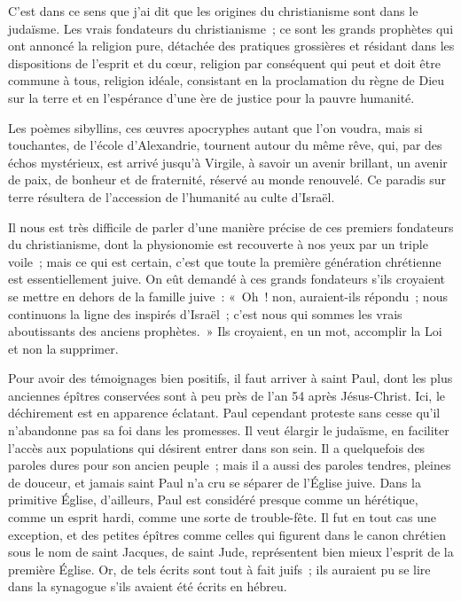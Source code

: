 \documentclass[french,twoside]{book} %
\newcommand\orgName[1]{#1}
\newcommand\persName[1]{#1}
\begin{document}
C’est dans ce sens que j’ai dit que les origines du christianisme sont dans le judaïsme. Les vrais fondateurs du christianisme ; ce sont les grands prophètes qui ont annoncé la religion pure, détachée des pratiques grossières et résidant dans les dispositions de l’esprit et du cœur, religion par conséquent qui peut et doit être commune à tous, religion idéale, consistant en la proclamation du règne de Dieu sur la terre et en l’espérance d’une ère de justice pour la pauvre humanité.\par
Les poèmes sibyllins, ces œuvres apocryphes autant que l’on voudra, mais si touchantes, de l’{\orgName école d’Alexandrie}, tournent autour du même rêve, qui, par des échos mystérieux, est arrivé jusqu’à Virgile, à savoir un avenir brillant, un avenir de paix, de bonheur et de fraternité, réservé au monde renouvelé. Ce paradis sur terre résultera de l’accession de l’humanité au culte d’Israël.\par
Il nous est très difficile de parler d’une manière précise de ces premiers fondateurs du christianisme, dont la physionomie est recouverte à nos yeux par un triple voile ; mais ce qui est certain, c’est que toute la première génération chrétienne est essentiellement juive. On eût demandé à ces grands fondateurs s’ils croyaient se mettre en dehors de la famille juive : « Oh ! non, auraient-ils répondu ; nous continuons la ligne des inspirés d’Israël ; c’est nous qui sommes les vrais aboutissants des anciens prophètes. » Ils croyaient, en un mot, accomplir la Loi et non la supprimer.\par
Pour avoir des témoignages bien positifs, il faut arriver à {\persName saint Paul}, dont les plus anciennes épîtres conservées sont à peu près de l’an 54 après Jésus-Christ. Ici, le déchirement est en apparence éclatant. {\persName Paul} cependant proteste sans cesse qu’il n’abandonne pas sa foi dans les promesses. Il veut élargir le judaïsme, en faciliter l’accès aux populations qui désirent entrer dans son sein. Il a quelquefois des paroles dures pour son ancien peuple ; mais il a aussi des paroles tendres, pleines de douceur, et jamais {\persName saint Paul} n’a cru se séparer de l’{\orgName Église juive}. Dans la primitive Église, d’ailleurs, Paul est considéré presque comme un hérétique, comme un esprit hardi, comme une sorte de trouble-fête. Il fut en tout cas une exception, et des petites épîtres comme celles qui figurent dans le canon chrétien sous le nom de {\persName saint Jacques}, de {\persName saint Jude}, représentent bien mieux l’esprit de la première Église. Or, de tels écrits sont tout à fait juifs ; ils auraient pu se lire dans la synagogue s’ils avaient été écrits en hébreu.\par
\end{document}
